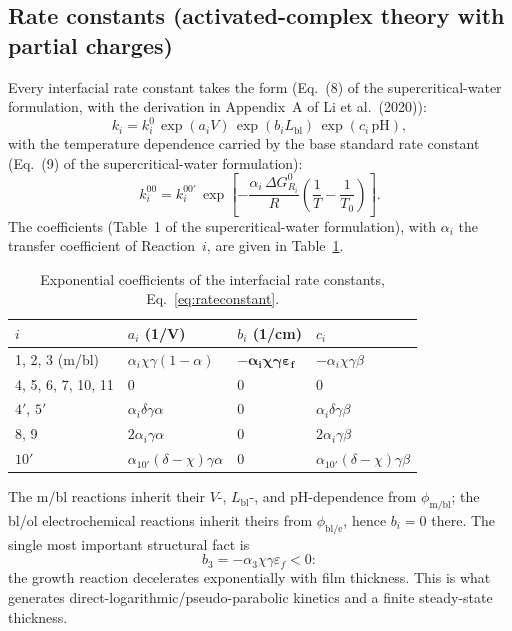 \subsection{Rate constants (activated-complex theory with partial charges)}
\label{sec:rates}

Every interfacial rate constant takes the form
(Eq.~(8) of the supercritical-water formulation, with the derivation in
Appendix~A of Li et al.\ (2020)):
\begin{equation}
k_i = k_i^{0}\, \exp(a_i V)\, \exp(b_i L_{\mathrm{bl}})\, \exp(c_i\,\mathrm{pH}) ,
\label{eq:rateconstant}
\end{equation}
with the temperature dependence carried by the base standard rate constant
(Eq.~(9) of the supercritical-water formulation):
\begin{equation}
k_i^{00} = k_i^{00\prime}\,
\exp\!\left[ -\frac{\alpha_i\, \Delta G^0_{R_i}}{R}
\left( \frac{1}{T} - \frac{1}{T_0} \right) \right] .
\end{equation}
The coefficients (Table~1 of the supercritical-water formulation), with
$\alpha_i$ the transfer coefficient of Reaction~$i$, are given in
Table~\ref{tab:coeffs}.

\begin{table}[htbp]
\centering
\caption{Exponential coefficients of the interfacial rate constants,
Eq.~\eqref{eq:rateconstant}.}
\label{tab:coeffs}
\begin{tabular}{llll}
\toprule
$i$ & $a_i$ (1/V) & $b_i$ (1/cm) & $c_i$ \\
\midrule
1, 2, 3 (m/bl) & $\alpha_i \chi \gamma (1-\alpha)$ &
$\boldsymbol{-\alpha_i \chi \gamma \varepsilon_f}$ &
$-\alpha_i \chi \gamma \beta$ \\
4, 5, 6, 7, 10, 11 & 0 & 0 & 0 \\
$4'$, $5'$ & $\alpha_i \delta \gamma \alpha$ & 0 & $\alpha_i \delta \gamma \beta$ \\
8, 9 & $2 \alpha_i \gamma \alpha$ & 0 & $2 \alpha_i \gamma \beta$ \\
$10'$ & $\alpha_{10'} (\delta-\chi) \gamma \alpha$ & 0 &
$\alpha_{10'} (\delta-\chi) \gamma \beta$ \\
\bottomrule
\end{tabular}
\end{table}

The m/bl reactions inherit their $V$-, $L_{\mathrm{bl}}$-, and pH-dependence
from $\phi_{\mathrm{m/bl}}$; the bl/ol electrochemical reactions inherit theirs
from $\phi_{\mathrm{bl/e}}$, hence $b_i = 0$ there. The single most important
structural fact is
\begin{equation}
b_3 = -\alpha_3 \chi \gamma \varepsilon_f < 0 :
\end{equation}
the growth reaction decelerates exponentially with film thickness. This is
what generates direct-logarithmic/pseudo-parabolic kinetics and a finite
steady-state thickness.

